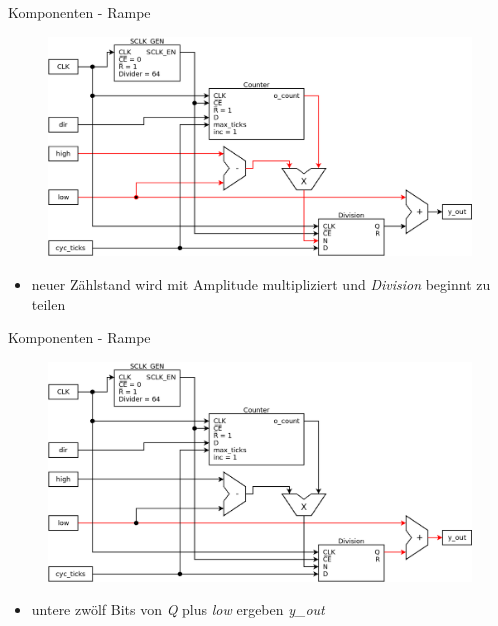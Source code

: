 \documentclass[11pt]{beamer}
\begin{document}
\begin{frame}[t]{Komponenten - Rampe}
  \begin{figure}
    \includegraphics[scale=0.28]{ramp_step2}
  \end{figure}
  \begin{itemize}
    \item neuer Zählstand wird mit Amplitude multipliziert und \emph{Division} beginnt zu teilen
  \end{itemize}
\end{frame}

\begin{frame}[t]{Komponenten - Rampe}
  \begin{figure}
    \includegraphics[scale=0.28]{ramp_step3}
  \end{figure}
  \begin{itemize}
    \item untere zwölf Bits von \emph{Q} plus \emph{low} ergeben \emph{y\_out}
  \end{itemize}
\end{frame}
\end{document}
